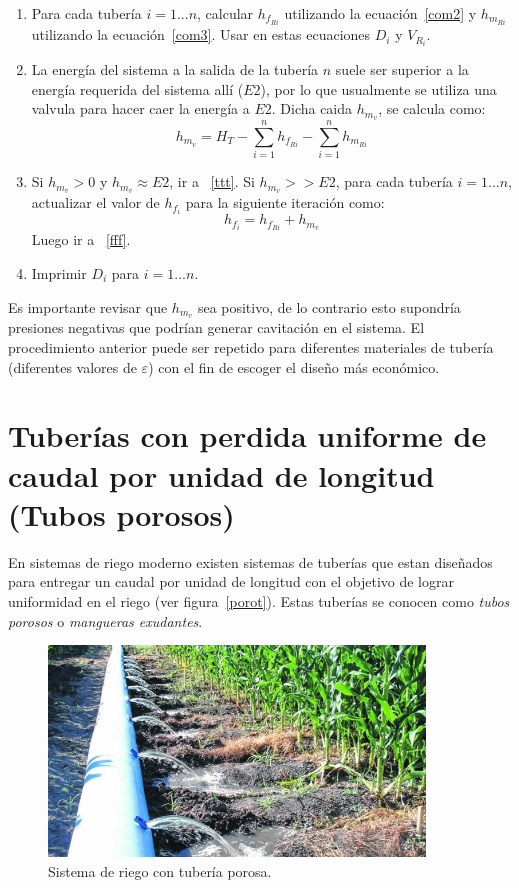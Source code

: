 \documentclass[10pt, oneside]{article}
\begin{document}
\begin{enumerate}
\item Para cada tuber\'ia $i=1...n$, calcular $h_{f_{Ri}}$ utilizando la ecuaci\'on~\ref{com2} y $h_{m_{Ri}}$  utilizando la ecuaci\'on~\ref{com3}. Usar en estas ecuaciones $D_i$ y $V_{R_i}$.
\item La energ\'ia del sistema a la salida de la tuber\'ia $n$ suele ser superior a la energ\'ia requerida del sistema all\'i ($E2$), por lo que usualmente se utiliza una valvula para hacer caer la energ\'ia a $E2$. Dicha caida $h_{m_v}$, se calcula como:
\begin{equation} 
h_{m_v} = H_T - \sum_{i=1}^n h_{f_{Ri}} - \sum_{i=1}^n h_{m_{Ri}}
\label{desp2}
\end{equation}
\item Si $h_{m_v} > 0$ y $h_{m_v} \approx E2$, ir a ~\ref{ttt}. Si $h_{m_v} >> E2$, para cada tuber\'ia $i=1...n$, actualizar el valor de $h_{f_i}$ para la siguiente iteraci\'on como:
\begin{equation} 
h_{f_i} = h_{f_{Ri}} + h_{m_v}
\label{desp3}
\end{equation}
Luego ir a ~\ref{fff}.

\item \label{ttt} Imprimir $D_i$ para $i=1...n$.

\end{enumerate}

Es importante revisar que $h_{m_v}$ sea positivo, de lo contrario esto supondr\'ia presiones negativas que podr\'ian generar cavitaci\'on en el sistema. El procedimiento anterior puede ser repetido para diferentes materiales de tuber\'ia (diferentes valores de $\varepsilon$) con el fin de escoger el dise\~no m\'as econ\'omico.


\section{Tuber\'ias con perdida uniforme de caudal por unidad de longitud (Tubos porosos)}
En sistemas de riego moderno existen sistemas de tuber\'ias que estan dise\~nados para entregar un caudal por unidad de longitud con el objetivo  de lograr uniformidad en el riego (ver figura~\ref{porot}). Estas tuber\'ias se conocen como \emph{tubos porosos} o \emph{mangueras exudantes}. 

\begin{figure}[h]
\centering
\includegraphics[width=10cm]{./figs/porot2.jpg}
\caption{Sistema de riego con tuber\'ia porosa.} 
\label{porot2}
\end{figure}
\end{document}
